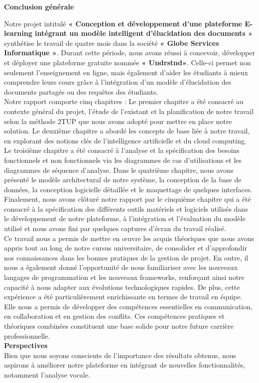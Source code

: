 \thispagestyle{empty}
\begin{center}
    \textbf{\Huge Conclusion générale}
\end{center}
  
Notre projet intitulé \textbf{« Conception et développement d’une plateforme E-learning intégrant un modèle intelligent d’élucidation des documents »} synthétise le travail de quatre mois dans la société \textbf{« Globe Services Informatique »}. Durant cette période, nous avons réussi à concevoir, développer et déployer  une plateforme  gratuite nommée \textbf{« Undrstnd»}. Celle-ci permet non seulement l’enseignement en ligne, mais également d’aider les étudiants à mieux comprendre leurs cours grâce à l'intégration d’un modèle d’élucidation des documents partagés ou des requêtes des étudiants. \\

Notre rapport comporte cinq chapitres : Le premier chapitre a été consacré au contexte général du projet, l’étude de l’existant et la planification de notre travail selon la méthode 2TUP que nous avons adopté pour mettre en place notre solution. Le deuxième chapitre a abordé les concepts de base liée à notre travail, en explorant des notions clés de l’intelligence artificielle et du cloud computing. Le troisième chapitre a été consacré à l’analyse et la spécification des besoins fonctionnels et non fonctionnels via les diagrammes de cas d’utilisations et les diagrammes de séquence d’analyse. Dans le quatrième chapitre, nous avons présenté le modèle architectural de notre système, la conception de la base de données, la conception logicielle détaillée et le maquettage de quelques interfaces. Finalement, nous avons clôturé notre rapport par le cinquième chapitre qui a été consacré à la spécification des différents outils matériels et logiciels utilisés dans le développement de notre plateforme, à l’intégration et l’évaluation du modèle utilisé et nous avons fini par quelques captures d’écran du travail réalisé.\\

Ce travail nous a permis de mettre en œuvre les acquis théoriques que nous avons appris tout au long de notre cursus universitaire, de consolider et d’approfondir nos connaissances dans les bonnes pratiques de la gestion de projet. En outre, il nous a également donné l'opportunité de nous familiariser avec les nouveaux langages de programmation et les nouveaux frameworks, renforçant ainsi notre capacité à nous adapter aux évolutions technologiques rapides. De plus, cette expérience a été particulièrement enrichissante en termes de travail en équipe. Elle nous a permis de développer des compétences essentielles en communication, en collaboration et en gestion des conflits. Ces compétences pratiques et théoriques combinées constituent une base solide pour notre future carrière professionnelle.\\

\noindent \textbf{Perspectives}\\
Bien que nous soyons conscients de l'importance des résultats obtenus, nous aspirons à améliorer notre plateforme en intégrant de nouvelles fonctionnalités, notamment l'analyse vocale. 
